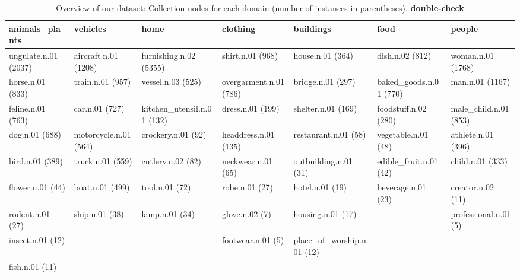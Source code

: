 \begin{table*}
	\begin{tabular}{@{~}l@{~}l@{~}l@{~}l@{~}l@{~}l@{~}l}
	\toprule
	        animals\_plants &               vehicles &                        home &                clothing &                   buildings &                    food &                 people \\
	\midrule
	  ungulate.n.01 (2037) &  aircraft.n.01 (1208) &  furnishing.n.02 (5355) &  shirt.n.01 (968) &  house.n.01 (364) &  dish.n.02 (812) &  woman.n.01 (1768) \\
	 horse.n.01 (833) &  train.n.01 (957) &  vessel.n.03 (525) &  overgarment.n.01 (786) &  bridge.n.01 (297) &  baked\_goods.n.01 (770) &  man.n.01 (1167) \\
	  feline.n.01 (763) &  car.n.01 (727) &  kitchen\_utensil.n.01 (132) &  dress.n.01 (199) &  shelter.n.01 (169) &  foodstuff.n.02 (280) &  male\_child.n.01 (853) \\
	 dog.n.01 (688) &  motorcycle.n.01 (564) &  crockery.n.01 (92) &  headdress.n.01 (135) &  restaurant.n.01 (58) &  vegetable.n.01 (48) &  athlete.n.01 (396) \\
	  bird.n.01 (389) &  truck.n.01 (559) &  cutlery.n.02 (82) &  neckwear.n.01 (65) &  outbuilding.n.01 (31) &  edible\_fruit.n.01 (42) &  child.n.01 (333) \\
	  flower.n.01 (44) &  boat.n.01 (499) &  tool.n.01 (72) &  robe.n.01 (27) &  hotel.n.01 (19) &  beverage.n.01 (23) &  creator.n.02 (11) \\
	  rodent.n.01 (27) &  ship.n.01 (38) &  lamp.n.01 (34) &  glove.n.02 (7) &  housing.n.01 (17) &   &  professional.n.01 (5) \\
	 insect.n.01 (12) &   &   &  footwear.n.01 (5) &  place\_of\_worship.n.01 (12) &   &   \\
	  fish.n.01 (11) &   &   &   &   &   &   \\
	\bottomrule
\end{tabular}
	\caption{Overview of our dataset: Collection nodes for each domain (number of instances in parentheses). \textbf{double-check} \label{tab:overview_dataset2}}
\end{table*}


